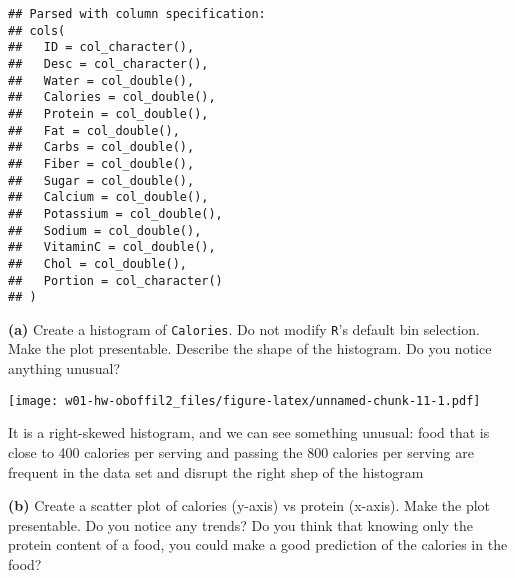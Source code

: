 \documentclass[]{article}
\newenvironment{Shaded}{\begin{snugshade}}{\end{snugshade}}
\newcommand{\DataTypeTok}[1]{\textcolor[rgb]{0.13,0.29,0.53}{#1}}
\newcommand{\DecValTok}[1]{\textcolor[rgb]{0.00,0.00,0.81}{#1}}
\newcommand{\KeywordTok}[1]{\textcolor[rgb]{0.13,0.29,0.53}{\textbf{#1}}}
\newcommand{\NormalTok}[1]{#1}
\newcommand{\OperatorTok}[1]{\textcolor[rgb]{0.81,0.36,0.00}{\textbf{#1}}}
\newcommand{\StringTok}[1]{\textcolor[rgb]{0.31,0.60,0.02}{#1}}
\begin{document}
\begin{verbatim}
## Parsed with column specification:
## cols(
##   ID = col_character(),
##   Desc = col_character(),
##   Water = col_double(),
##   Calories = col_double(),
##   Protein = col_double(),
##   Fat = col_double(),
##   Carbs = col_double(),
##   Fiber = col_double(),
##   Sugar = col_double(),
##   Calcium = col_double(),
##   Potassium = col_double(),
##   Sodium = col_double(),
##   VitaminC = col_double(),
##   Chol = col_double(),
##   Portion = col_character()
## )
\end{verbatim}

\textbf{(a)} Create a histogram of \texttt{Calories}. Do not modify
\texttt{R}'s default bin selection. Make the plot presentable. Describe
the shape of the histogram. Do you notice anything unusual?

\begin{Shaded}
\end{Shaded}

\texttt{[image: w01-hw-oboffil2\_files/figure-latex/unnamed-chunk-11-1.pdf]}

It is a right-skewed histogram, and we can see something unusual: food
that is close to 400 calories per serving and passing the 800 calories
per serving are frequent in the data set and disrupt the right shep of
the histogram

\textbf{(b)} Create a scatter plot of calories (y-axis) vs protein
(x-axis). Make the plot presentable. Do you notice any trends? Do you
think that knowing only the protein content of a food, you could make a
good prediction of the calories in the food?
\end{document}
